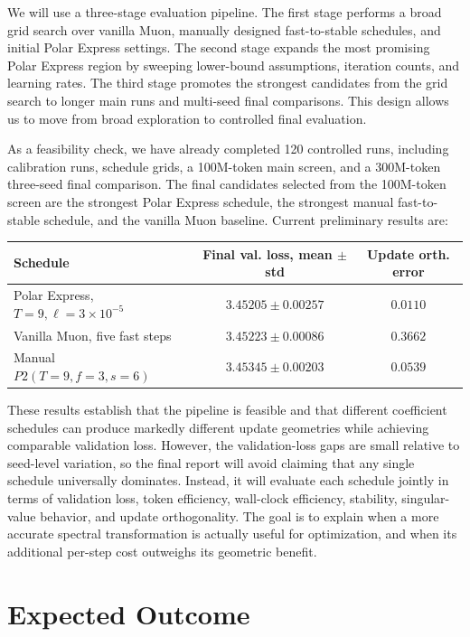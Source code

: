 \documentclass[10pt]{article}
\begin{document}
We will use a three-stage evaluation pipeline. The first stage performs a broad grid search over vanilla Muon, manually designed fast-to-stable schedules, and initial Polar Express settings. The second stage expands the most promising Polar Express region by sweeping lower-bound assumptions, iteration counts, and learning rates. The third stage promotes the strongest candidates from the grid search to longer main runs and multi-seed final comparisons. This design allows us to move from broad exploration to controlled final evaluation.

As a feasibility check, we have already completed 120 controlled runs, including calibration runs, schedule grids, a 100M-token main screen, and a 300M-token three-seed final comparison. The final candidates selected from the 100M-token screen are the strongest Polar Express schedule, the strongest manual fast-to-stable schedule, and the vanilla Muon baseline. Current preliminary results are:

\begin{center}
\small
\begin{tabular}{lcc}
\toprule
Schedule & Final val. loss, mean $\pm$ std & Update orth. error \\
\midrule
Polar Express, $T=9,\ell=3{\times}10^{-5}$ & $3.45205 \pm 0.00257$ & $0.0110$ \\
Vanilla Muon, five fast steps & $3.45223 \pm 0.00086$ & $0.3662$ \\
Manual $P2(T=9,f=3,s=6)$ & $3.45345 \pm 0.00203$ & $0.0539$ \\
\bottomrule
\end{tabular}
\end{center}

These results establish that the pipeline is feasible and that different coefficient schedules can produce markedly different update geometries while achieving comparable validation loss. However, the validation-loss gaps are small relative to seed-level variation, so the final report will avoid claiming that any single schedule universally dominates. Instead, it will evaluate each schedule jointly in terms of validation loss, token efficiency, wall-clock efficiency, stability, singular-value behavior, and update orthogonality. The goal is to explain when a more accurate spectral transformation is actually useful for optimization, and when its additional per-step cost outweighs its geometric benefit.


\section*{Expected Outcome}
\end{document}
